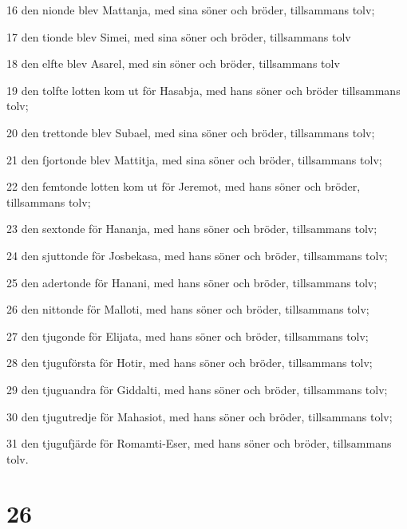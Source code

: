 \par 16 den nionde blev Mattanja, med sina söner och bröder, tillsammans tolv;
\par 17 den tionde blev Simei, med sina söner och bröder, tillsammans tolv
\par 18 den elfte blev Asarel, med sin söner och bröder, tillsammans tolv
\par 19 den tolfte lotten kom ut för Hasabja, med hans söner och bröder tillsammans tolv;
\par 20 den trettonde blev Subael, med sina söner och bröder, tillsammans tolv;
\par 21 den fjortonde blev Mattitja, med sina söner och bröder, tillsammans tolv;
\par 22 den femtonde lotten kom ut för Jeremot, med hans söner och bröder, tillsammans tolv;
\par 23 den sextonde för Hananja, med hans söner och bröder, tillsammans tolv;
\par 24 den sjuttonde för Josbekasa, med hans söner och bröder, tillsammans tolv;
\par 25 den adertonde för Hanani, med hans söner och bröder, tillsammans tolv;
\par 26 den nittonde för Malloti, med hans söner och bröder, tillsammans tolv;
\par 27 den tjugonde för Elijata, med hans söner och bröder, tillsammans tolv;
\par 28 den tjuguförsta för Hotir, med hans söner och bröder, tillsammans tolv;
\par 29 den tjuguandra för Giddalti, med hans söner och bröder, tillsammans tolv;
\par 30 den tjugutredje för Mahasiot, med hans söner och bröder, tillsammans tolv;
\par 31 den tjugufjärde för Romamti-Eser, med hans söner och bröder, tillsammans tolv.

\chapter{26}

